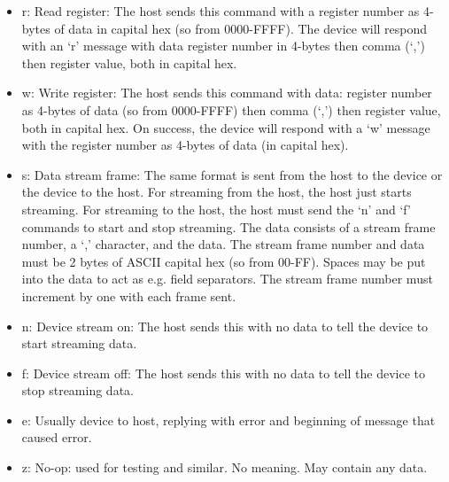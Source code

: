 \documentclass{customdocclass}
\begin{document}
\begin{itemize}
  \item r: Read register: The host sends this command with a register number as 4-bytes of data in capital hex (so from 0000-FFFF). The device will respond with an `r' message with data register number in 4-bytes then comma (`,') then register value, both in capital hex.
  \item w: Write register: The host sends this command with data: register number as 4-bytes of data (so from 0000-FFFF) then comma (`,') then register value, both in capital hex. On success, the device will respond with a `w' message with the register number as 4-bytes of data (in capital hex).
  \item s: Data stream frame: The same format is sent from the host to the device or the device to the host. For streaming from the host, the host just starts streaming. For streaming to the host, the host must send the `n' and `f' commands to start and stop streaming. The data consists of a stream frame number, a `,' character, and the data. The stream frame number and data must be 2 bytes of ASCII capital hex (so from 00-FF). Spaces may be put into the data to act as e.g. field separators. The stream frame number must increment by one with each frame sent.
  \item n: Device stream on: The host sends this with no data to tell the device to start streaming data.
  \item f: Device stream off: The host sends this with no data to tell the device to stop streaming data.
  \item e: Usually device to host, replying with error and beginning of message that caused error.
  \item z: No-op: used for testing and similar. No meaning. May contain any data.
\end{itemize}
\end{document}
